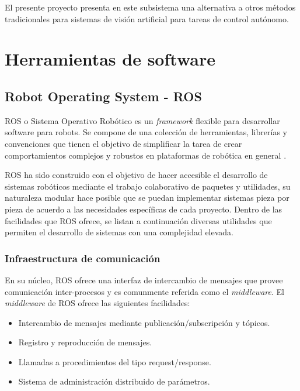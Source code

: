     El presente proyecto presenta en este subsistema una alternativa a otros métodos tradicionales para sistemas de visión artificial 
    para tareas de control autónomo.

    
\section{Herramientas de software}\label{sec:software}
    \subsection{Robot Operating System - ROS}\label{sec:ros}
    ROS o Sistema Operativo Robótico es un \textit{framework} flexible para desarrollar software para robots. Se compone 
    de una colección de herramientas, librerías y convenciones que tienen el objetivo de simplificar la tarea de crear 
    comportamientos complejos y robustos en plataformas de robótica en general \cite{ros}.

    ROS ha sido construido con el objetivo de hacer accesible el desarrollo de sistemas robóticos mediante el trabajo 
    colaborativo de paquetes y utilidades, su naturaleza modular hace posible que se puedan implementar sistemas pieza 
    por pieza de acuerdo a las necesidades específicas de cada proyecto. Dentro de las facilidades que ROS ofrece, se listan 
    a continuación diversas utilidades que permiten el desarrollo de sistemas con una complejidad elevada.

        \subsubsection{Infraestructura de comunicación}
        En su núcleo, ROS ofrece una interfaz de intercambio de mensajes que provee comunicación inter-procesos y es 
        comunmente referida como el \textit{middleware}. El \textit{middleware} de ROS ofrece las siguientes facilidades:

        \begin{itemize}
            \item Intercambio de mensajes mediante publicación/subscripción y tópicos.
            \item Registro y reproducción de mensajes.
            \item Llamadas a procedimientos del tipo request/response.
            \item Sistema de administración distribuido de parámetros.
        \end{itemize}

